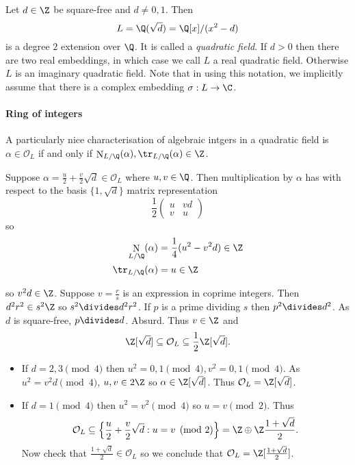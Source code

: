 \documentclass[a4paper]{article}
\renewcommand*{\O}{\mathcal{O}}
\DeclareMathOperator{\n}{N}
\begin{document}
\maketitle

Let \(d \in \Z\) be square-free and \(d \neq 0, 1\). Then
\[
  L = \Q(\sqrt d) = \Q[x]/(x^2 - d)
\]
is a degree \(2\) extension over \(\Q\). It is called a \emph{quadratic field}. If \(d > 0\) then there are two real embeddings, in which case we call \(L\) a real quadratic field. Otherwise \(L\) is an imaginary quadratic field. Note that in using this notation, we implicitly assume that there is a complex embedding \(\sigma: L \to \C\).

\paragraph{Ring of integers}

A particularly nice characterisation of algebraic intgers in a quadratic field is \(\alpha \in \O_L\) if and only if \(\n_{L/\Q}(\alpha), \tr_{L/\Q}(\alpha) \in \Z\).

Suppose \(\alpha = \frac{u}{2} + \frac{v}{2}\sqrt d \in \O_L\) where \(u, v \in \Q\). Then multiplication by \(\alpha\) has with respect to the basis \(\{1, \sqrt d\}\) matrix representation
\[
  \frac{1}{2}
  \begin{pmatrix}
    u & vd \\
    v & u
  \end{pmatrix}
\]
so
\begin{align*}
  \n_{L/\Q}(\alpha) &= \frac{1}{4}(u^2 - v^2d) \in \Z \\
  \tr_{L/\Q}(\alpha) &= u \in \Z
\end{align*}

so \(v^2d \in \Z\). Suppose \(v = \frac{r}{s}\) is an expression in coprime integers. Then \(d^2r^2 \in s^2\Z\) so \(s^2 \divides d^2r^2\). If \(p\) is a prime dividing \(s\) then \(p^2 \divides d^2\). As \(d\) is square-free, \(p \divides d\). Absurd. Thus \(v \in \Z\) and
\[
  \Z[\sqrt d] \subseteq \O_L \subseteq \frac{1}{2}\Z[\sqrt d].
\]

\begin{itemize}
\item If \(d = 2, 3 \pmod 4\) then \(u^2 = 0, 1 \pmod 4, v^2 = 0, 1 \pmod 4\). As \(u^2 = v^2d \pmod 4\), \(u, v \in 2\Z\) so \(\alpha \in \Z[\sqrt d]\). Thus \(\O_L = \Z[\sqrt d]\).
\item If \(d = 1 \pmod 4\) then \(u^2 = v^2 \pmod 4\) so \(u = v \pmod 2\). Thus
  \[
    \O_L \subseteq \left\{ \frac{u}{2} + \frac{v}{2}\sqrt d: u = v \pmod 2 \right\} = \Z \oplus \Z \frac{1 + \sqrt d}{2}.
  \]
  Now check that \(\frac{1 + \sqrt d}{2} \in \O_L\) so we conclude that \(\O_L = \Z[\frac{1 + \sqrt d}{2}]\).
\end{itemize}
\end{document}
